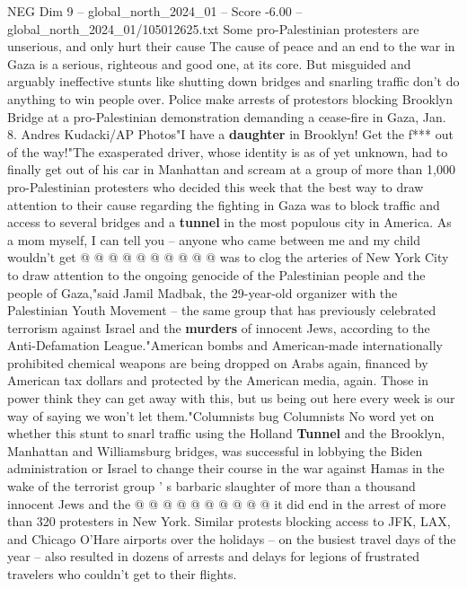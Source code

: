 \begin{textsample}{NEG Dim 9 – global\_north\_2024\_01 – Score -6.00 – global\_north\_2024\_01/105012625.txt}  \label{ex:f9_neg_200}
Some pro-Palestinian protesters are unserious, and only hurt their cause The cause of peace and an end to the war in Gaza is a serious, righteous and good one, at its core.
But misguided and arguably ineffective stunts like shutting down bridges and snarling traffic don't do anything to win people over.
Police make arrests of protestors blocking Brooklyn Bridge at a pro-Palestinian demonstration demanding a cease-fire in Gaza, Jan. 8.
Andres Kudacki/AP Photos"I have a \textbf{daughter} in Brooklyn!
Get the f*** out of the way!"The exasperated driver, whose identity is as of yet unknown, had to finally get out of his car in Manhattan and scream at a group of more than 1,000 pro-Palestinian protesters who decided this week that the best way to draw attention to their cause regarding the fighting in Gaza was to block traffic and access to several bridges and a \textbf{tunnel} in the most populous city in America.
As a mom myself, I can tell you -- anyone who came between me and my child wouldn't get @ @ @ @ @ @ @ @ @ @ was to clog the arteries of New York City to draw attention to the ongoing genocide of the Palestinian people and the people of Gaza,"said Jamil Madbak, the 29-year-old organizer with the Palestinian Youth Movement -- the same group that has previously celebrated terrorism against Israel and the \textbf{murders} of innocent Jews, according to the Anti-Defamation League."American bombs and American-made internationally prohibited chemical weapons are being dropped on Arabs again, financed by American tax dollars and protected by the American media, again.
Those in power think they can get away with this, but us being out here every week is our way of saying we won't let them."Columnists bug Columnists No word yet on whether this stunt to snarl traffic using the Holland \textbf{Tunnel} and the Brooklyn, Manhattan and Williamsburg bridges, was successful in lobbying the Biden administration or Israel to change their course in the war against Hamas in the wake of the terrorist group ' s barbaric slaughter of more than a thousand innocent Jews and the @ @ @ @ @ @ @ @ @ @ it did end in the arrest of more than 320 protesters in New York.
Similar protests blocking access to JFK, LAX, and Chicago O'Hare airports over the holidays -- on the busiest travel days of the year -- also resulted in dozens of arrests and delays for legions of frustrated travelers who couldn't get to their flights.

\end{textsample}
